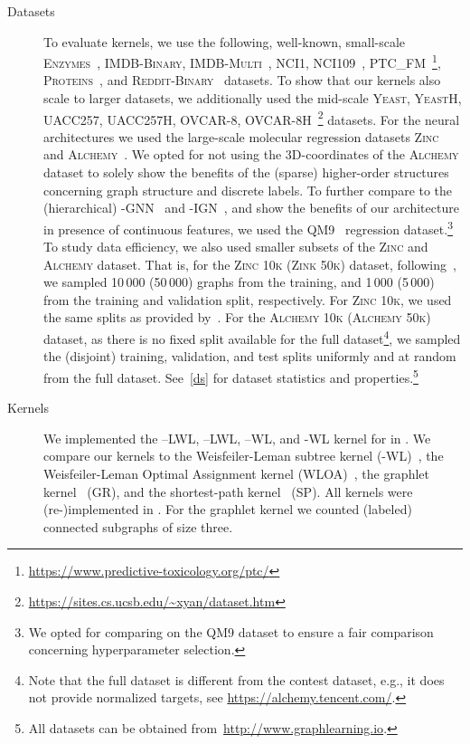 \documentclass{article}
\theoremstyle{definition}
\newcommand{\CC}[1][]{}
\newcommand{\wl}{-\textsf{WL}\xspace}
\newcommand{\kwl}{-\textsf{WL}\xspace}
\newcommand{\deltakwl}{--\textsf{WL}\xspace}
\newcommand{\localkwl}{--\textsf{LWL}\xspace}
\newcommand{\pluskwl}{--\textsf{LWL}\xspace}
\newcommand{\kgnn}{\textrm{-}\textsf{GNN}\xspace}
\newcommand{\kign}{\textrm{-}\textsf{IGN}\xspace}
\newcommand{\shp}{\textsf{SP}\xspace}
\newcommand{\gr}{\textsf{GR}\xspace}
\newcommand{\wloa}{\textsf{WLOA}\xspace}
\begin{document}
\begin{description}
	\item[Datasets] To evaluate kernels, we use the following, well-known, small-scale \textsc{Enzymes}~\cite{Sch+2004,Bor+2005}, \textsc{IMDB-Binary}, \textsc{IMDB-Multi}~\cite{Yan+2015a}, \textsc{NCI1}, \textsc{NCI109}~\cite{Wal+2008}, \textsc{PTC\_FM}~\cite{Hel+2001}\footnote{\url{https://www.predictive-toxicology.org/ptc/}}, \textsc{Proteins}~\cite{Dob+2003,Bor+2005}, and \textsc{Reddit-Binary}~\cite{Yan+2015a} datasets. To show that our kernels also scale to larger datasets, we additionally used the mid-scale \textsc{Yeast}, \textsc{YeastH}, \textsc{UACC257}, \textsc{UACC257H}, \textsc{OVCAR-8}, \textsc{OVCAR-8H}~\cite{Yan+2008}\footnote{\url{https://sites.cs.ucsb.edu/~xyan/dataset.htm}} datasets. For the neural architectures we used the large-scale molecular regression datasets \textsc{Zinc}~\cite{Dwi+2020,Jin+2018a} and \textsc{Alchemy}~\cite{Che+2020}.
	We opted for not using the 3D-coordinates of the \textsc{Alchemy} dataset to solely show the benefits of the (sparse) higher-order structures concerning graph structure and discrete labels.
	To further compare to the (hierarchical) \kgnn~\cite{Mor+2019} and \kign~\cite{Mar+2019}, and show the benefits of our architecture in presence of continuous features, we used the \textsc{QM9}~\cite{Ram+2014,Wu+2018} regression dataset.\footnote{We opted for comparing on the \textsc{QM9} dataset to ensure a fair comparison concerning hyperparameter selection.}
	To study data efficiency, we also used smaller subsets of the \textsc{Zinc} and \textsc{Alchemy} dataset. That is, for the \textsc{Zinc 10k} (\textsc{Zink 50k}) dataset, following~\cite{Dwi+2020}, we sampled 10\,000 (50\,000) graphs from the training, and 1\,000 (5\,000) from the training and validation split, respectively. For \textsc{Zinc 10k}, we used the same splits as provided by~\cite{Dwi+2020}. For the \textsc{Alchemy 10k} (\textsc{Alchemy 50k}) dataset, as there is no fixed split available for the full dataset\footnote{Note that the full dataset is different from the contest dataset, e.g., it does not provide normalized targets, see \url{https://alchemy.tencent.com/}.}, we sampled the (disjoint) training, validation, and test splits uniformly and at random from the full dataset. See~\cref{ds} for dataset statistics and properties.\footnote{All datasets can be obtained from~\url{http://www.graphlearning.io}.} 
	
	\item[Kernels] We implemented the \localkwl, \pluskwl, \deltakwl, and  \kwl kernel for  in . We compare our kernels to the Weisfeiler-Leman subtree kernel (\wl)~\cite{She+2011}, the Weisfeiler-Leman Optimal Assignment kernel (\wloa)~\cite{Kri+2016}, the graphlet kernel~\cite{She+2009} (\gr), and the shortest-path kernel~\cite{Bor+2005} (\shp). All kernels were (re-)implemented in \CC[11]. For the graphlet kernel we counted (labeled) connected subgraphs of size three. 
	

\end{description}
\end{document}
